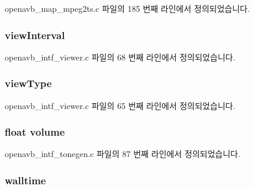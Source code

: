 openavb\+\_\+map\+\_\+mpeg2ts.\+c 파일의 185 번째 라인에서 정의되었습니다.

\subsubsection[{\texorpdfstring{view\+Interval}{viewInterval}}]{ view\+Interval}\hypertarget{structpvt__data__t_a96895cef13efbe6566d80b1c5875dbfd}{}\label{structpvt__data__t_a96895cef13efbe6566d80b1c5875dbfd}


openavb\+\_\+intf\+\_\+viewer.\+c 파일의 68 번째 라인에서 정의되었습니다.

\subsubsection[{\texorpdfstring{view\+Type}{viewType}}]{ view\+Type}\hypertarget{structpvt__data__t_a68ebf8be79af6cd5c4cd023297d8fb65}{}\label{structpvt__data__t_a68ebf8be79af6cd5c4cd023297d8fb65}


openavb\+\_\+intf\+\_\+viewer.\+c 파일의 65 번째 라인에서 정의되었습니다.

\subsubsection[{\texorpdfstring{volume}{volume}}]{\setlength{\rightskip}{0pt plus 5cm}float volume}\hypertarget{structpvt__data__t_a016abda2855c77dcc1630f9d2f9f8d18}{}\label{structpvt__data__t_a016abda2855c77dcc1630f9d2f9f8d18}


openavb\+\_\+intf\+\_\+tonegen.\+c 파일의 87 번째 라인에서 정의되었습니다.

\subsubsection[{\texorpdfstring{walltime}{walltime}}]{ walltime}\hypertarget{structpvt__data__t_a2f29a533efa3c288af81f4dd4f576989}{}\label{structpvt__data__t_a2f29a533efa3c288af81f4dd4f576989}


